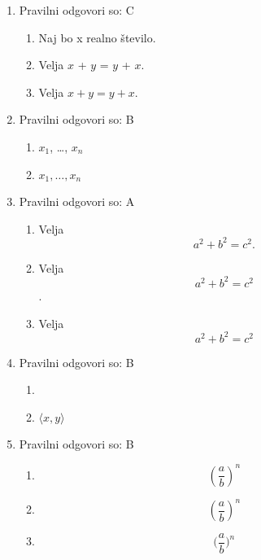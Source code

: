 \documentclass[11pt]{article}
\begin{document}
\begin{enumerate}
    \item Pravilni odgovori so: C %
    \begin{enumerate}
        \item Naj bo x realno število.
        \item Velja \(x\) + \(y\) = \(y\) + \(x\).
        \item Velja \(x + y = y + x\).
    \end{enumerate}

    \item Pravilni odgovori so: B %
    \begin{enumerate}
        \item \(x_1\), \dots, \(x_n\)
        \item \(x_1, \ldots, x_n\)
    \end{enumerate}

    \item Pravilni odgovori so: A %
    \begin{enumerate}
        \item
Velja
\[
  a^2 + b^2 = c^2.
\]
        \item
Velja
\[
  a^2 + b^2 = c^2
\]
.
        \item
Velja
\[
  a^2 + b^2 = c^2
\]
    \end{enumerate}

    \item Pravilni odgovori so: B %
    \begin{enumerate}
        \item \(<x, y>\)
        \item \(\langle x, y \rangle\)
    \end{enumerate}

    \item Pravilni odgovori so: B  %
    \begin{enumerate}
        \item \[ (\frac{a}{b})^n \]
        \item \[ \left(\frac{a}{b}\right)^n \]
        \item \[ \Big(\frac{a}{b}\Big)^n \]
    \end{enumerate}


\end{enumerate}
\end{document}
